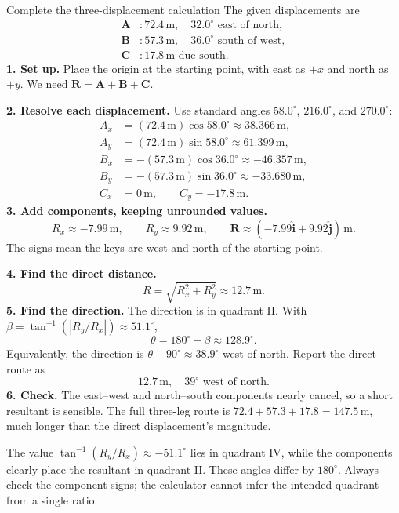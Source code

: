 \documentclass[11pt,letterpaper]{article}
\newcommand{\vect}[1]{\boldsymbol{#1}}
\newcommand{\uv}[1]{\hat{\boldsymbol{#1}}}
\newcommand{\unit}[1]{\,\mathrm{#1}}
\newcommand{\degree}{^{\circ}}
\begin{document}
\begin{examplebox}{Complete the three-displacement calculation}
The given displacements are
\[
 \begin{aligned}
 \vect A &: 72.4\unit{m},\quad32.0\degree\text{ east of north},\\
 \vect B &: 57.3\unit{m},\quad36.0\degree\text{ south of west},\\
 \vect C &: 17.8\unit{m}\text{ due south}.
 \end{aligned}
\]
\textbf{1. Set up.} Place the origin at the starting point, with east as $+x$ and north as $+y$. We need $\vect R=\vect A+\vect B+\vect C$.

\textbf{2. Resolve each displacement.} Use standard angles $58.0\degree$, $216.0\degree$, and $270.0\degree$:
\begin{align*}
 A_x&=(72.4\unit{m})\cos58.0\degree\approx38.366\unit{m},\\
 A_y&=(72.4\unit{m})\sin58.0\degree\approx61.399\unit{m},\\
 B_x&=-(57.3\unit{m})\cos36.0\degree\approx-46.357\unit{m},\\
 B_y&=-(57.3\unit{m})\sin36.0\degree\approx-33.680\unit{m},\\
 C_x&=0\unit{m},\qquad C_y=-17.8\unit{m}.
\end{align*}
\textbf{3. Add components, keeping unrounded values.}
\[
 R_x\approx-7.99\unit{m},\qquad R_y\approx9.92\unit{m},
 \qquad\boxed{\vect R\approx(-7.99\uv i+9.92\uv j)\unit{m}.}
\]
The signs mean the keys are west and north of the starting point.

\textbf{4. Find the direct distance.}
\[
 R=\sqrt{R_x^2+R_y^2}\approx\boxed{12.7\unit{m}}.
\]
\textbf{5. Find the direction.} The direction is in quadrant II. With
$\beta=\tan^{-1}(|R_y/R_x|)\approx51.1\degree$,
\[
 \theta=180\degree-\beta\approx128.9\degree.
\]
Equivalently, the direction is $\theta-90\degree\approx38.9\degree$ west of north. Report the direct route as
\[
 \boxed{12.7\unit{m},\quad39\degree\text{ west of north}.}
\]
\textbf{6. Check.} The east--west and north--south components nearly cancel, so a short resultant is sensible. The full three-leg route is $72.4+57.3+17.8=147.5\unit{m}$, much longer than the direct displacement's magnitude.
\end{examplebox}

\begin{watchbox}
The value $\tan^{-1}(R_y/R_x)\approx-51.1\degree$ lies in quadrant IV, while the components clearly place the resultant in quadrant II. These angles differ by $180\degree$. Always check the component signs; the calculator cannot infer the intended quadrant from a single ratio.
\end{watchbox}
\end{document}

